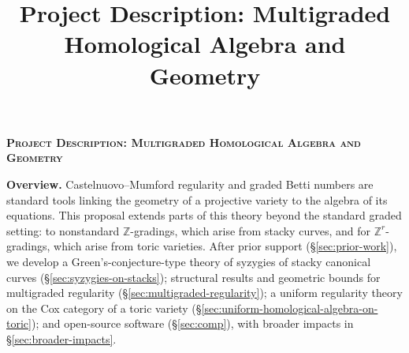 \documentclass[11pt,reqno]{amsart}
\title{Project Description: Multigraded Homological Algebra and Geometry}
\theoremstyle{remark}
\newcommand{\ZZ}{\mathbb{Z}}
\begin{document}
 
\thispagestyle{empty}
\pagestyle{empty}
\begingroup  
  \centering
  \large\scshape\bfseries Project Description: Multigraded Homological Algebra and Geometry\\[1em]
\endgroup


\setcounter{section}{0}

\noindent\textbf{Overview.} Castelnuovo--Mumford regularity and graded Betti numbers are standard tools linking the geometry of a projective variety to the algebra of its equations. This proposal extends parts of this theory beyond the standard graded setting: to nonstandard $\ZZ$-gradings, which arise from stacky curves, and for $\ZZ^r$-gradings, which arise from toric varieties. After prior support (\S\ref{sec:prior-work}), we develop a Green's-conjecture-type theory of syzygies of stacky canonical curves (\S\ref{sec:syzygies-on-stacks}); structural results and geometric bounds for multigraded regularity (\S\ref{sec:multigraded-regularity}); a uniform regularity theory on the Cox category of a toric variety (\S\ref{sec:uniform-homological-algebra-on-toric}); and open-source software (\S\ref{sec:comp}), with broader impacts in \S\ref{sec:broader-impacts}.

%

\end{document}
